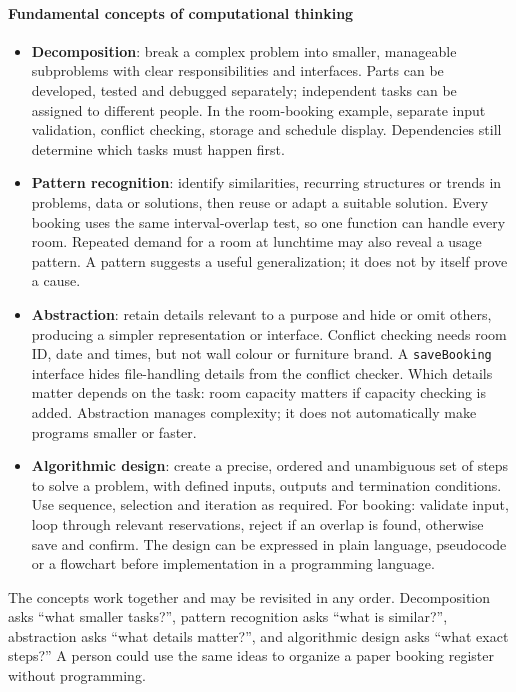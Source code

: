 \documentclass[a4paper,12pt]{article}
\begin{document}
\paragraph{Fundamental concepts of computational thinking}
\begin{itemize}
    \item \textbf{Decomposition}: break a complex problem into smaller, manageable subproblems with clear responsibilities and interfaces. Parts can be developed, tested and debugged separately; independent tasks can be assigned to different people. In the room-booking example, separate input validation, conflict checking, storage and schedule display. Dependencies still determine which tasks must happen first.
    \item \textbf{Pattern recognition}: identify similarities, recurring structures or trends in problems, data or solutions, then reuse or adapt a suitable solution. Every booking uses the same interval-overlap test, so one function can handle every room. Repeated demand for a room at lunchtime may also reveal a usage pattern. A pattern suggests a useful generalization; it does not by itself prove a cause.
    \item \textbf{Abstraction}: retain details relevant to a purpose and hide or omit others, producing a simpler representation or interface. Conflict checking needs room ID, date and times, but not wall colour or furniture brand. A \texttt{saveBooking} interface hides file-handling details from the conflict checker. Which details matter depends on the task: room capacity matters if capacity checking is added. Abstraction manages complexity; it does not automatically make programs smaller or faster.
    \item \textbf{Algorithmic design}: create a precise, ordered and unambiguous set of steps to solve a problem, with defined inputs, outputs and termination conditions. Use sequence, selection and iteration as required. For booking: validate input, loop through relevant reservations, reject if an overlap is found, otherwise save and confirm. The design can be expressed in plain language, pseudocode or a flowchart before implementation in a programming language.
\end{itemize}
The concepts work together and may be revisited in any order. Decomposition asks ``what smaller tasks?'', pattern recognition asks ``what is similar?'', abstraction asks ``what details matter?'', and algorithmic design asks ``what exact steps?'' A person could use the same ideas to organize a paper booking register without programming.
\end{document}
